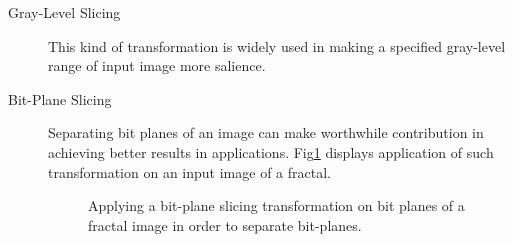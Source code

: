 \documentclass{article}
\begin{document}
\begin{description}
\begin{description}
 \item[Gray-Level Slicing] This kind of transformation is widely used in making a specified gray-level range of input image more salience. 
 
 \item[Bit-Plane Slicing] Separating bit planes of an image can make worthwhile contribution in achieving better results in applications. Fig\ref{fig:bitPlaneSlicing} displays application of such transformation on an input image of a fractal.
\begin{figure}
\center
{}
\caption{Applying a bit-plane slicing transformation on bit planes of a fractal image in order to separate bit-planes.}
\label{fig:bitPlaneSlicing}
\end{figure} 
 
 \end{description}
 
 
 \end{description}





\end{document}

